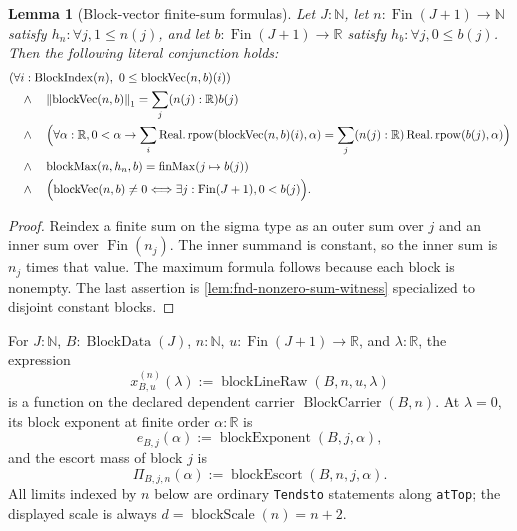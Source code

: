 \documentclass[9pt]{extarticle}
\newtheorem{lemma}{Lemma}[section]
\theoremstyle{definition}
\theoremstyle{remark}
\newcommand{\R}{\mathbb R}
\newcommand{\N}{\mathbb N}
\newcommand{\norm}[1]{\left\lVert #1\right\rVert}
\begin{document}
\begin{lemma}[Block-vector finite-sum formulas]
\label{lem:block-vector-formulas}
Let $J:\N$, let $n:\operatorname{Fin}(J+1)\to\N$ satisfy
$h_n:\forall j,1\leq n(j)$, and let
$b:\operatorname{Fin}(J+1)\to\R$ satisfy
$h_b:\forall j,0\leq b(j)$.  Then the following literal conjunction holds:
\begin{align*}
 &(\forall i:\operatorname{BlockIndex}(n),\
      0\leq\operatorname{blockVec}(n,b)(i))\\
 &\quad\wedge\quad
 \norm{\operatorname{blockVec}(n,b)}_1
   =\sum_j(n(j):\R)b(j)\\
 &\quad\wedge\quad
 \Bigl(\forall\alpha:\R,0<\alpha\to
  \sum_i\operatorname{Real.rpow}
    (\operatorname{blockVec}(n,b)(i),\alpha)
  =\sum_j(n(j):\R)\operatorname{Real.rpow}(b(j),\alpha)\Bigr)\\
 &\quad\wedge\quad
 \operatorname{blockMax}(n,h_n,b)
   =\operatorname{finMax}(j\mapsto b(j))\\
 &\quad\wedge\quad
 \Bigl(\operatorname{blockVec}(n,b)\neq0
   \Longleftrightarrow\exists j:\operatorname{Fin}(J+1),0<b(j)\Bigr).
\end{align*}
\end{lemma}

\begin{proof}
Reindex a finite sum on the sigma type as an outer sum over $j$ and an inner
sum over $\operatorname{Fin}(n_j)$.  The inner summand is constant, so the
inner sum is $n_j$ times that value.  The maximum formula follows because
each block is nonempty.  The last assertion is
\cref{lem:fnd-nonzero-sum-witness} specialized to disjoint constant blocks.
\end{proof}

For $J:\N$, $B:\operatorname{BlockData}(J)$, $n:\N$,
$u:\operatorname{Fin}(J+1)\to\R$, and $\lambda:\R$, the expression
\begin{equation}
 x_{B,u}^{(n)}(\lambda):=
 \operatorname{blockLineRaw}(B,n,u,\lambda)
 \label{eq:general-block}
\end{equation}
is a function on the declared dependent carrier
$\operatorname{BlockCarrier}(B,n)$.  At $\lambda=0$, its block exponent at
finite order $\alpha:\R$ is
\begin{equation}
 e_{B,j}(\alpha):=\operatorname{blockExponent}(B,j,\alpha),
 \label{eq:block-exponent}
\end{equation}
and the escort mass of block $j$ is
\begin{equation}
 \Pi_{B,j,n}(\alpha):=\operatorname{blockEscort}(B,n,j,\alpha).
 \label{eq:block-escort}
\end{equation}
All limits indexed by $n$ below are ordinary \texttt{Tendsto} statements
along \texttt{atTop}; the displayed scale is always
$d=\operatorname{blockScale}(n)=n+2$.
\end{document}
